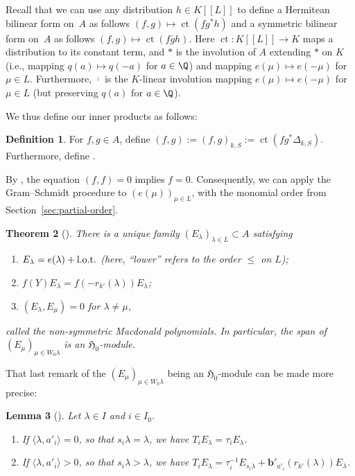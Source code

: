 \documentclass[pdftex]{sigma}
\newtheorem{Theorem}{Theorem}[section]
\newtheorem{Lemma}[Theorem]{Lemma}
\theoremstyle{definition}
\newtheorem{Definition}[Theorem]{Definition}
\DeclareMathOperator{\ct}{ct}
\numberwithin{equation}{section}
\begin{document}
Recall that we can use any distribution $h\in K[[L]]$
to define a Hermitean bilinear form on~$A$ as follows
$
 (f,g) \mapsto \ct(fg^* h)
$
and a symmetric bilinear form on~$A$ as follows
$
 (f,g)\mapsto \ct(f\overline{g}h)$.
Here $\ct\colon K[[L]]\to K$ maps a distribution to its constant term, and $*$ is the involution of $A$ extending $*$ on $K$
(i.e., mapping $q(a)\mapsto q(-a)$ for $a\in\Q$) and mapping
$e(\mu)\mapsto e(-\mu)$ for $\mu\in L$.
Furthermore, $\overline{\cdot}$ is the $K$-linear
involution mapping $e(\mu)\mapsto e(-\mu)$ for $\mu\in L$ (but preserving $q(a)$ for $a\in\Q$).

We thus define our inner products as follows:
\begin{Definition}\label{def-inner-product}
 For $f,g\in A$, define
$
 (f,g):= (f,g)_{k,S} := \ct(fg^*\Delta_{k,S})$.
 Furthermore, define
\smash{$
 (f,g)_1 := \frac{(f,g)}{(1,1)}
 = \ct(fg^*\Delta_{k,S,1})\in K$}.
\end{Definition}

By \cite[Section~5.1.20]{macdonald}, the equation $(f,f)=0$ implies $f=0$.
Consequently, we can apply the Gram--Schmidt procedure
to $(e(\mu))_{\mu\in L}$, with the monomial order from Section~\ref{sec:partial-order}.
\begin{Theorem}[{\cite[Section~5.2.1ff]{macdonald}}]\label{sec:thm-E}
 There is a unique family $(E_\lambda)_{\lambda\in L}\subset A$ satisfying
 \begin{enumerate}\itemsep=0pt
 \item[$(i)$] $E_{\lambda} = e(\lambda) + \text{\rm l.o.t.}$ {\rm(}here, ``lower'' refers
 to the order $\le$ on $L${\rm)};
 \item[$(ii)$] $f(Y) E_\lambda = f(-r_{k'}(\lambda)) E_\lambda$;
 \item[$(iii)$] $(E_\lambda, E_\mu)=0$ for $\lambda\ne\mu$,
 \end{enumerate}
 called the non-symmetric Macdonald polynomials.
 In particular, the span of $(E_\mu)_{\mu\in W_0\lambda}$ is
 an $\mathfrak{H}_0$-module.
\end{Theorem}

That last remark of the $(E_\mu)_{\mu\in W_0\lambda}$ being an
$\mathfrak{H}_0$-module can be made more precise:
\begin{Lemma}[{\cite[Section~5.4.3f]{macdonald}}]\label{sec:lem-Ti-action-E}
 Let $\lambda\in I$ and $i\in I_0$.
 \begin{enumerate}\itemsep=0pt
 \item[$(i)$] If $\langle\lambda, a'_i\rangle=0$, so that $s_i\lambda=\lambda$,
 we have $T_iE_\lambda = \tau_i E_\lambda$.
 \item[$(ii)$] If $\langle\lambda, a'_i\rangle>0$, so that $s_i\lambda>\lambda$,
 we have $T_iE_\lambda = \tau_i^{-1} E_{s_i\lambda} + \bm{b}'_{a'_i}(r_{k'}(\lambda))E_\lambda$.
 \end{enumerate}
\end{Lemma}
\end{document}
